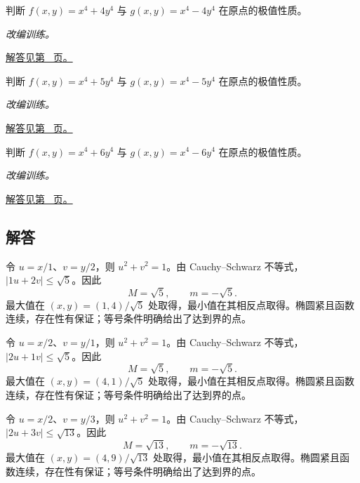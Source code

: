 \documentclass[UTF8,12pt,a4paper,fontset=fandol]{ctexart}
\begin{document}
\begin{example}\label{ex:c35q22}
判断 $f(x,y)=x^4+4y^4$ 与 $g(x,y)=x^4-4y^4$ 在原点的极值性质。
\par\textit{改编训练。}\par\hyperref[ans:c35q22]{解答见第~\pageref{ans:c35q22} 页。}
\end{example}
\begin{example}\label{ex:c35q23}
判断 $f(x,y)=x^4+5y^4$ 与 $g(x,y)=x^4-5y^4$ 在原点的极值性质。
\par\textit{改编训练。}\par\hyperref[ans:c35q23]{解答见第~\pageref{ans:c35q23} 页。}
\end{example}
\begin{example}\label{ex:c35q24}
判断 $f(x,y)=x^4+6y^4$ 与 $g(x,y)=x^4-6y^4$ 在原点的极值性质。
\par\textit{改编训练。}\par\hyperref[ans:c35q24]{解答见第~\pageref{ans:c35q24} 页。}
\end{example}
\subsection{解答}
\begin{solve}\label{ans:c35q1}
令 $u=x/1$、$v=y/2$，则 $u^2+v^2=1$。由 Cauchy--Schwarz 不等式，$|1u+2v|\le\sqrt{5}$。因此
\[
M=\sqrt{5},\qquad m=-\sqrt{5}.
\]
最大值在 $(x,y)=(1,4)/\sqrt{5}$ 处取得，最小值在其相反点取得。椭圆紧且函数连续，存在性有保证；等号条件明确给出了达到界的点。
\end{solve}

\begin{solve}\label{ans:c35q2}
令 $u=x/2$、$v=y/1$，则 $u^2+v^2=1$。由 Cauchy--Schwarz 不等式，$|2u+1v|\le\sqrt{5}$。因此
\[
M=\sqrt{5},\qquad m=-\sqrt{5}.
\]
最大值在 $(x,y)=(4,1)/\sqrt{5}$ 处取得，最小值在其相反点取得。椭圆紧且函数连续，存在性有保证；等号条件明确给出了达到界的点。
\end{solve}

\begin{solve}\label{ans:c35q3}
令 $u=x/2$、$v=y/3$，则 $u^2+v^2=1$。由 Cauchy--Schwarz 不等式，$|2u+3v|\le\sqrt{13}$。因此
\[
M=\sqrt{13},\qquad m=-\sqrt{13}.
\]
最大值在 $(x,y)=(4,9)/\sqrt{13}$ 处取得，最小值在其相反点取得。椭圆紧且函数连续，存在性有保证；等号条件明确给出了达到界的点。
\end{solve}
\end{document}
